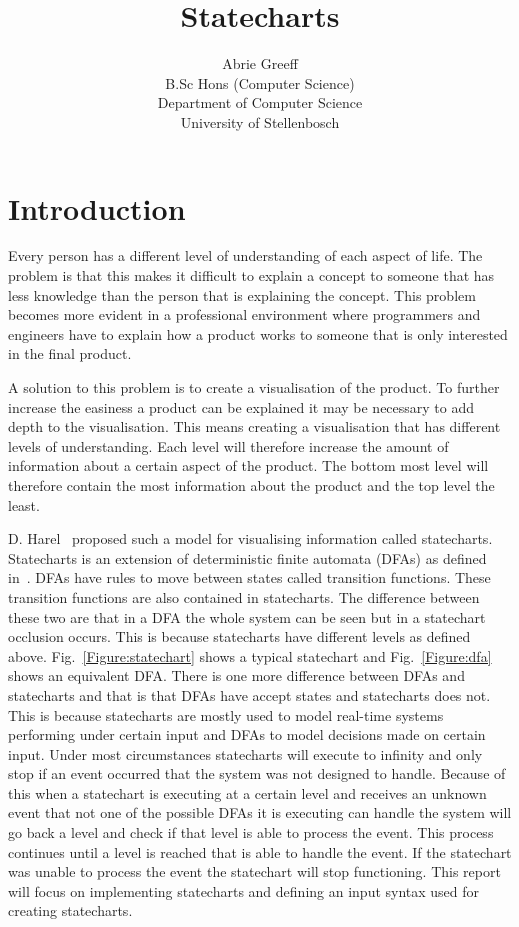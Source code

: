 \documentclass[a4paper,11pt,titlepage]{article}
\author{Abrie Greeff\\B.Sc Hons (Computer Science)\\Department of Computer Science\\University of Stellenbosch}
\title{Statecharts}
\begin{document}
\maketitle
\tableofcontents

\section{Introduction}
Every person has a different level of understanding of each aspect of life. The problem is that this makes it difficult to explain a concept to someone that has less knowledge than the person that is explaining the concept. This problem becomes more evident in a professional environment where programmers and engineers have to explain how a product works to someone that is only interested in the final product.

A solution to this problem is to create a visualisation of the product. To further increase the easiness a product can be explained it may be necessary to add depth to the visualisation. This means creating a visualisation that has different levels of understanding. Each level will therefore increase the amount of information about a certain aspect of the product. The bottom most level will therefore contain the most information about the product and the top level the least.

D. Harel~\cite{Harel} proposed such a model for visualising information called statecharts. Statecharts is an extension of deterministic finite automata (DFAs) as defined in~\cite{sipser}. DFAs have rules to move between states called transition functions. These transition functions are also contained in statecharts. The difference between these two are that in a DFA the whole system can be seen but in a statechart occlusion occurs. This is because statecharts have different levels as defined above.
Fig.~\ref{Figure:statechart} shows a typical statechart and Fig.~\ref{Figure:dfa} shows an equivalent DFA. There is one more difference between DFAs and statecharts and that is that DFAs have accept states and statecharts does not. This is because statecharts are mostly used to model real-time systems performing under certain input and DFAs to model decisions made on certain input. Under most circumstances statecharts will execute to infinity and only stop if an event occurred that the system was not designed to handle. Because of this when a statechart is executing at a certain level and receives an unknown event that not one of the possible DFAs it is executing can handle the system will go back a level and check if that level is able to process the event. This process continues until a level is reached that is able to handle the event. If the statechart was unable to process the event the statechart will stop functioning. This report will focus on implementing statecharts and defining an input syntax used for creating statecharts.
\end{document}

